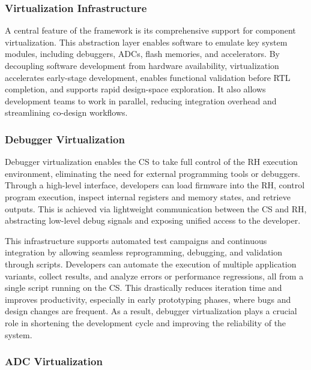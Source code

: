             \subsubsection{Virtualization Infrastructure}
            
                A central feature of the framework is its comprehensive support for component virtualization. This abstraction layer enables software to emulate key system modules, including debuggers, ADCs, flash memories, and accelerators. By decoupling software development from hardware availability, virtualization accelerates early-stage development, enables functional validation before RTL completion, and supports rapid design-space exploration. It also allows development teams to work in parallel, reducing integration overhead and streamlining co-design workflows.
            
                \subsubsection*{Debugger Virtualization}
                
                    Debugger virtualization enables the CS to take full control of the RH execution environment, eliminating the need for external programming tools or debuggers. Through a high-level interface, developers can load firmware into the RH, control program execution, inspect internal registers and memory states, and retrieve outputs. This is achieved via lightweight communication between the CS and RH, abstracting low-level debug signals and exposing unified access to the developer.
                    
                    This infrastructure supports automated test campaigns and continuous integration by allowing seamless reprogramming, debugging, and validation through scripts. Developers can automate the execution of multiple application variants, collect results, and analyze errors or performance regressions, all from a single script running on the CS. This drastically reduces iteration time and improves productivity, especially in early prototyping phases, where bugs and design changes are frequent. As a result, debugger virtualization plays a crucial role in shortening the development cycle and improving the reliability of the system.
                
                \subsubsection*{ADC Virtualization}
                
